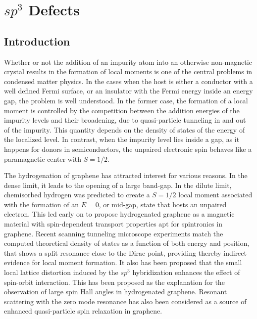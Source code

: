 \chapter{$sp^3$ Defects}

\section{Introduction}
Whether or not the addition of an impurity atom into an otherwise non-magnetic crystal results in the formation of local moments is one of the central problems in condensed matter physics.\cite{anderson1961localized}
In the cases when the host is either a conductor with a well defined Fermi surface, or an insulator with the Fermi energy inside an energy gap, the problem is well understood.
In the former case, the formation of a local moment is controlled by the competition between the addition energies of the impurity levels and their broadening, due to quasi-particle tunneling in and out of the impurity\cite{anderson1961localized,Daybell1968}. This quantity depends on the density of states of the energy of the localized level.
In contrast, when the impurity level lies inside a gap, as it happens for donors in semiconductors, the unpaired electronic spin behaves like a paramagnetic center with $S=1/2$.\cite{Slichter1955}


The hydrogenation of graphene has attracted interest for various reasons. In
the dense limit, it leads to the opening of a large
band-gap.\cite{elias2009,Sofo2007} In the dilute limit, chemisorbed hydrogen
was predicted to create a $S=1/2$ local moment
\cite{Duplock2004,yazyev2007,Boukhvalov2008,Palacios2008,Yazyev2010,santos2012} associated
with the formation of an $E=0$, or mid-gap, state that hosts an unpaired electron.
This led early on to propose hydrogenated graphene as a magnetic material with
spin-dependent transport properties\cite{Soriano2010,Leconte2011,Soriano2011}
apt for spintronics in graphene.\cite{han2014graphene} Recent scanning
tunneling microscope experiments\cite{gonzalez2016atomic} match the computed
theoretical density of states as a function of both energy and position, that
shows a split resonance close to the Dirac point, providing thereby indirect
evidence for local moment formation. %
It also has been proposed that the small local lattice distortion induced by
the $sp^3$ hybridization enhances the effect of spin-orbit
interaction.\cite{Castro2009,gmitra13} This has been proposed as the
explanation for the observation of large spin Hall angles in hydrogenated
graphene.\cite{balakrishnan2013colossal} Resonant scattering with the zero mode
resonance has also been considered as a source of enhanced quasi-particle spin
relaxation in graphene.\cite{Wojtaszek2013,Kochan2014,soriano2015}

